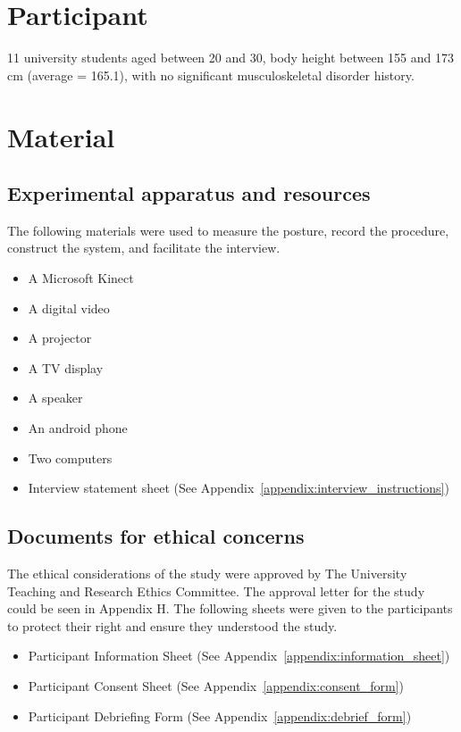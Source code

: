\section{Participant}
11 university students aged between 20 and 30, body height between 155 and 173 cm (average = 165.1), with no significant musculoskeletal disorder history.

\section{Material}
\subsection{Experimental apparatus and resources}
The following materials were used to measure the posture, record the procedure, construct the system, and facilitate the interview.

\begin{itemize}
\item A Microsoft Kinect
\item A digital video
\item A projector
\item A TV display
\item A speaker
\item An android phone
\item Two computers
\item Interview statement sheet (See Appendix~\ref{appendix:interview_instructions})
\end{itemize}

\subsection{Documents for ethical concerns}
The ethical considerations of the study were approved by The University Teaching and Research Ethics Committee. The approval letter for the study could be seen in Appendix H. The following sheets were given to the participants to protect their right and ensure they understood the study.

\begin{itemize}
\item Participant Information Sheet (See Appendix~\ref{appendix:information_sheet})
\item Participant Consent Sheet (See Appendix~\ref{appendix:consent_form})
\item Participant Debriefing Form (See Appendix~\ref{appendix:debrief_form}) 
\end{itemize}


